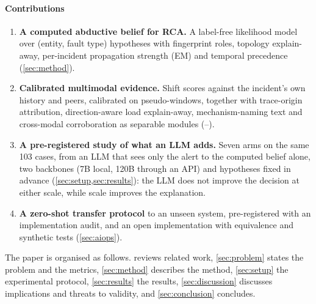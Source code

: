 \paragraph{Contributions}
\begin{enumerate}
\item \textbf{A computed abductive belief for RCA.} A label-free likelihood model over (entity, fault type) hypotheses with
fingerprint roles, topology explain-away, per-incident propagation strength (EM) and temporal precedence (\cref{sec:method}).
\item \textbf{Calibrated multimodal evidence.} Shift scores against the incident's own history and peers, calibrated on
pseudo-windows, together with trace-origin attribution, direction-aware load explain-away, mechanism-naming text and cross-modal
corroboration as separable modules (--).
\item \textbf{A pre-registered study of what an LLM adds.} Seven arms on the same 103 cases, from an LLM that sees only the alert
to the computed belief alone, two backbones (7B local, 120B through an API) and hypotheses fixed in advance
(\cref{sec:setup,sec:results}): the LLM does not improve the decision at either scale, while scale improves the explanation.
\item \textbf{A zero-shot transfer protocol} to an unseen system, pre-registered with an implementation audit, and an open
implementation with equivalence and synthetic tests (\cref{sec:aiops}).
\end{enumerate}

The paper is organised as follows.  reviews related work, \cref{sec:problem} states the problem and the metrics,
\cref{sec:method} describes the method, \cref{sec:setup} the experimental protocol, \cref{sec:results} the results,
\cref{sec:discussion} discusses implications and threats to validity, and \cref{sec:conclusion} concludes.
